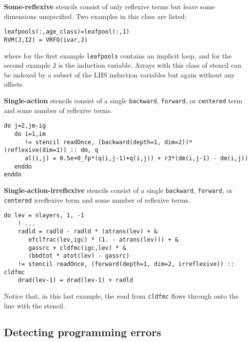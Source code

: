 \documentclass[9pt]{sigplanconf}
\theoremstyle{definition}
\newcommand{\term}[1]{\texttt{#1}}
\begin{document}
\textbf{Some-reflexive} stencils consist of only reflexive terms but
leave some dimensions unspecified. Two examples in this class are listed:
\begin{verbatim}
leafpools(:,age_class)=leafpool(:,1)
RVM(J,I2) = VRFO(ivar,J)
\end{verbatim}
where for the first example \texttt{leafpools} contains an
implicit loop, and for the second example \texttt{J} is
the induction variable. Arrays with this class of stencil can be
indexed by a subset of the LHS induction variables but again without
any offsets.

\textbf{Single-action} stencils consist of a single \term{backward},
\term{forward}, or \term{centered} term and some number of reflexive
terms.
\begin{verbatim}
do j=2,jm-ig
   do i=1,im
      != stencil readOnce, (backward(depth=1, dim=2))*(reflexive(dim=1)) :: dm, q
      al(i,j) = 0.5e+0_fp*(q(i,j-1)+q(i,j)) + r3*(dm(i,j-1) - dm(i,j))
   enddo
enddo
\end{verbatim}

\textbf{Single-action-irreflexive} stencils consist of a single
\term{backward}, \term{forward}, or \term{centered} irreflexive term
and some number of reflexive terms.
\begin{verbatim}
do lev = nlayers, 1, -1
    ! ...
    radld = radld - radld * (atrans(lev) + &
       efclfrac(lev,igc) * (1. - atrans(lev))) + &
       gassrc + cldfmc(igc,lev) * &
       (bbdtot * atot(lev) - gassrc)
    != stencil readOnce, (forward(depth=1, dim=2, irreflexive)) :: cldfmc
    drad(lev-1) = drad(lev-1) + radld
\end{verbatim}
Notice that, in this last example, the read from
\texttt{cldfmc} flows through onto the line with the
stencil.


\subsection{Detecting programming errors}


\end{document}
